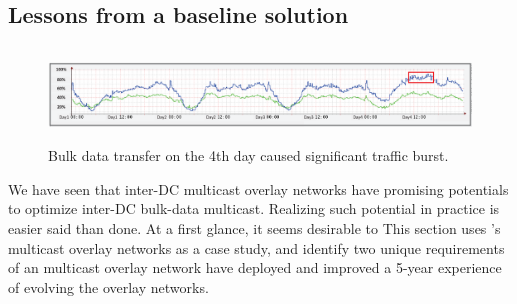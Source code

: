 %
%
%
%

\subsection{Lessons from a baseline solution}
\label{subsec:motivation:baseline}

\begin{figure}[t]
        \center
        \includegraphics[height=25mm,width=150mm]{images/nj02-M2A_0212-0216.eps}
        \caption{Bulk data transfer on the 4th day caused significant traffic burst.}
        \label{fig:lesson2}
\end{figure}

We have seen that inter-DC multicast overlay networks have 
promising potentials to optimize inter-DC bulk-data multicast. 
Realizing such potential in practice is easier said than done.
At a first glance, it seems desirable to 
This section uses \company's multicast overlay networks as a case 
study, and identify two unique requirements of an multicast 
overlay network
\company have deployed and improved a 
5-year experience of evolving the overlay networks.


